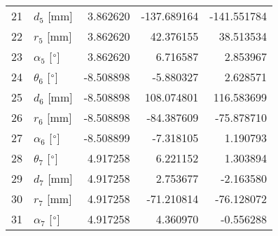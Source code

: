 \documentclass{standalone}%
\begin{document}
\begin{tabular}{llrrr}
21 &              $d_{5}$ [mm] &  3.862620 & -137.689164 & -141.551784 \\
22 &              $r_{5}$ [mm] &  3.862620 &   42.376155 &   38.513534 \\
23 &  $\alpha_{5}$ [$\degree$] &  3.862620 &    6.716587 &    2.853967 \\
24 &  $\theta_{6}$ [$\degree$] & -8.508898 &   -5.880327 &    2.628571 \\
25 &              $d_{6}$ [mm] & -8.508898 &  108.074801 &  116.583699 \\
26 &              $r_{6}$ [mm] & -8.508898 &  -84.387609 &  -75.878710 \\
27 &  $\alpha_{6}$ [$\degree$] & -8.508899 &   -7.318105 &    1.190793 \\
28 &  $\theta_{7}$ [$\degree$] &  4.917258 &    6.221152 &    1.303894 \\
29 &              $d_{7}$ [mm] &  4.917258 &    2.753677 &   -2.163580 \\
30 &              $r_{7}$ [mm] &  4.917258 &  -71.210814 &  -76.128072 \\
31 &  $\alpha_{7}$ [$\degree$] &  4.917258 &    4.360970 &   -0.556288 \\
\bottomrule
\end{tabular}
%
\end{document}
